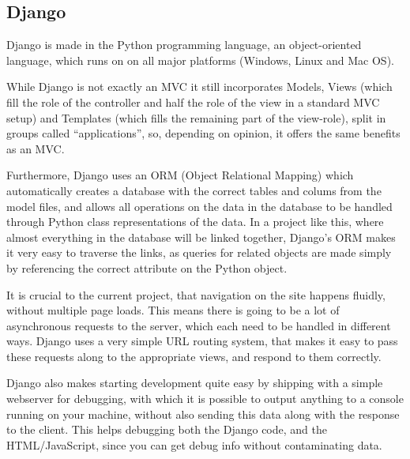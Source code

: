 \subsection{Django}
Django is made in the Python programming language, an object-oriented language, 
which runs on on all major platforms 
(Windows, Linux and Mac OS)\cite{psf11}.
 
While Django is not exactly an MVC\cite{dalling09} it still incorporates 
Models, Views (which fill the role of the controller and half the role of the 
view in a standard MVC setup) and Templates (which fills the remaining part of 
the view-role), split in groups called ``applications'', so, depending on 
opinion, it offers the same benefits as an MVC.

Furthermore, Django uses an ORM (Object Relational Mapping)\cite{techtarget08} 
which automatically creates a database with the correct tables and colums from 
the model files, and allows all operations on the data in the database to be 
handled through Python class representations of the data. 
In a project like this, where almost everything in the 
database will be linked together, 
Django's ORM makes it very easy to traverse the links, as queries for related 
objects are made simply by referencing the correct attribute on the 
Python object.

It is crucial to the current project, that navigation on the site happens 
fluidly, without multiple page loads. This means there is going to be a lot of 
asynchronous requests to the server, which each need to be handled in different ways. 
Django uses a very simple URL routing system, that makes it easy to pass these 
requests along to the appropriate views, and respond to them correctly.

Django also makes starting development quite easy by shipping with a simple 
webserver for debugging, with which it is possible to output anything to a 
console running on your machine, without also sending this data along with the 
response to the client. This helps debugging both the Django code, and the 
HTML/JavaScript, since you can get debug info without contaminating data.